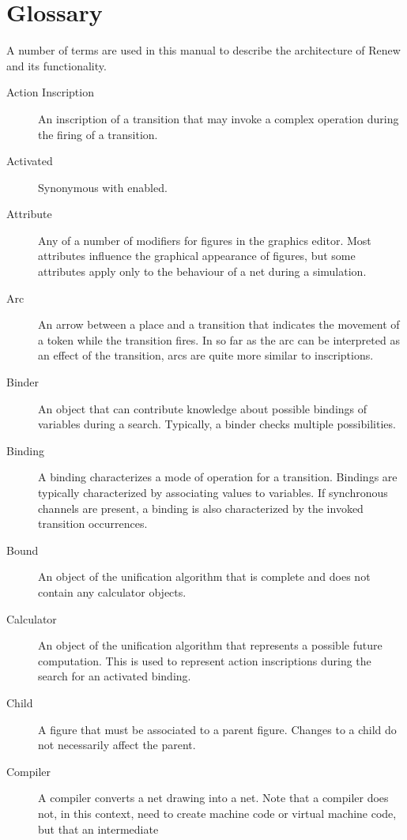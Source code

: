\chapter{Glossary}

A number of terms are used in this manual to describe the 
architecture of Renew and its functionality.

\begin{description}
\item[Action Inscription] An \see inscription of a \see transition
  that may invoke a complex operation during the \see firing
  of a transition.
\item[Activated] Synonymous with \see enabled.
\item[Attribute] Any of a number of modifiers for figures in
  the graphics editor. Most attributes influence the graphical appearance
  of \see figures, but some attributes apply only
  to the behaviour of a \see net during a \see simulation.
\item[Arc] An arrow between a \see place and a \see transition that
  indicates the movement of a \see token while the \see transition
  \see fires. In so far as the arc can be interpreted as an effect
  of the \see transition, arcs are quite more similar to inscriptions.
\item[Binder] An object that can contribute knowledge about possible
  bindings of variables during a search. Typically, a binder
  checks multiple possibilities.
\item[Binding] A binding characterizes a mode of operation
  for a \see transition.
  Bindings are typically characterized by associating values to variables.
  If \see synchronous channels are present, a binding is
  also characterized by the invoked \see transition occurrences.
\item[Bound] An object of the \see unification algorithm
  that is complete and does not contain any \see calculator objects.
\item[Calculator] An object of the \see unification algorithm
  that represents a possible future computation. This is used
  to represent \see action inscriptions during the
  search for an \see activated binding.
\item[Child] A \see figure that must be associated to a \see parent figure.
  Changes to a child do not necessarily affect the \see parent.
\item[Compiler] A compiler converts a \see net drawing into a \see net.
  Note that a compiler does not, in this context, need to create
  machine code or virtual machine code, but that an intermediate

\end{description}
